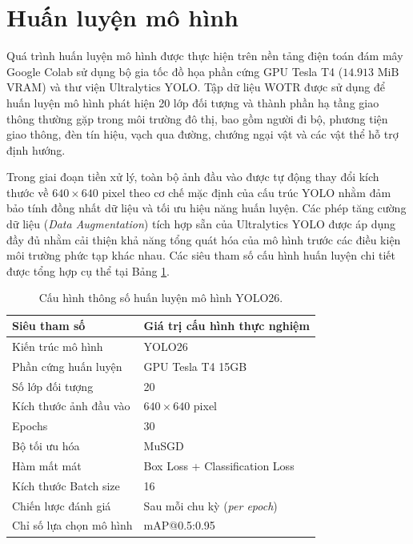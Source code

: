 \section{Huấn luyện mô hình}
Quá trình huấn luyện mô hình được thực hiện trên nền tảng điện toán đám mây Google Colab sử dụng bộ gia tốc đồ họa phần cứng GPU Tesla T4 ($14.913 \text{ MiB}$ VRAM) và thư viện Ultralytics YOLO. Tập dữ liệu WOTR được sử dụng để huấn luyện mô hình phát hiện 20 lớp đối tượng và thành phần hạ tầng giao thông thường gặp trong môi trường đô thị, bao gồm người đi bộ, phương tiện giao thông, đèn tín hiệu, vạch qua đường, chướng ngại vật và các vật thể hỗ trợ định hướng.

Trong giai đoạn tiền xử lý, toàn bộ ảnh đầu vào được tự động thay đổi kích thước về $640 \times 640$ pixel theo cơ chế mặc định của cấu trúc YOLO nhằm đảm bảo tính đồng nhất dữ liệu và tối ưu hiệu năng huấn luyện. Các phép tăng cường dữ liệu (\textit{Data Augmentation}) tích hợp sẵn của Ultralytics YOLO được áp dụng đầy đủ nhằm cải thiện khả năng tổng quát hóa của mô hình trước các điều kiện môi trường phức tạp khác nhau. Các siêu tham số cấu hình huấn luyện chi tiết được tổng hợp cụ thể tại Bảng \ref{tab:hyperparameters}.

\begin{table}[h]
    \centering
    \caption{Cấu hình thông số huấn luyện mô hình YOLO26.}
    \label{tab:hyperparameters}
    \begin{tabular}{ll}
        \toprule
        \textbf{Siêu tham số} & \textbf{Giá trị cấu hình thực nghiệm} \\
        \midrule
        Kiến trúc mô hình             & YOLO26 \\
        Phần cứng huấn luyện          & GPU Tesla T4 15GB \\
        Số lớp đối tượng              & 20 \\
        Kích thước ảnh đầu vào        & $640 \times 640$ pixel \\
        Epochs                        & 30 \\
        Bộ tối ưu hóa                 & MuSGD \\
        Hàm mất mát                   & Box Loss + Classification Loss \\
        Kích thước Batch size         & 16 \\
        Chiến lược đánh giá           & Sau mỗi chu kỳ (\textit{per epoch}) \\
        Chỉ số lựa chọn mô hình       & mAP@0.5:0.95 \\
        \bottomrule
    \end{tabular}
\end{table}

